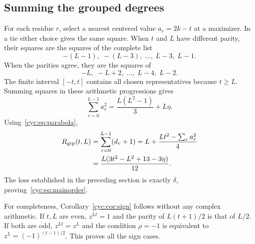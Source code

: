 \documentclass[11pt,a4paper]{article}
\numberwithin{equation}{section}
\theoremstyle{definition}
\theoremstyle{remark}
\newcommand{\Rgrp}{R_{\mathrm{grp}}}
\begin{document}
\subsection{Summing the grouped degrees}
For each residue $r$, select a nearest centered value
$a_r=2k-t$ at a maximizer.  In a tie either choice gives the same square.
When $t$ and $L$ have different parity, their squares are the squares
of the complete list
\[
 -(L-1),\;-(L-3),\;\ldots,\;L-3,\;L-1.
\]
When the parities agree, they are the squares of
\[
 -L,\;-L+2,\;\ldots,\;L-4,\;L-2.
\]
The finite interval $[-t,t]$ contains all chosen representatives
because $t\ge L$.  Summing squares in these arithmetic progressions
gives
\begin{equation}\label{cyc:eq:squares}
 \sum_{r=0}^{L-1}a_r^2=\frac{L(L^2-1)}3+L\eta.
\end{equation}
Using~\eqref{cyc:eq:parabola},
\begin{align}
 \Rgrp(t,L)
 &=\sum_{r=0}^{L-1}(d_r+1)
  =L+\frac{Lt^2-\sum_r a_r^2}{4}\notag\\
 &=\frac{L(3t^2-L^2+13-3\eta)}{12}.
 \label{cyc:eq:grouporder}
\end{align}
The loss established in the preceding section is exactly $\delta$,
proving~\eqref{cyc:eq:mainorder}.

For completeness, Corollary~\ref{cyc:cor:sign} follows without any complex
arithmetic.  If $t,L$ are even, $z^{Lt}=1$ and the parity of
$L(t+1)/2$ is that of $L/2$.  If both are odd, $z^{Lt}=z^L$ and
the condition $\rho=-1$ is equivalent to
$z^L=(-1)^{(t-1)/2}$.  This proves all the sign cases.
\end{document}
